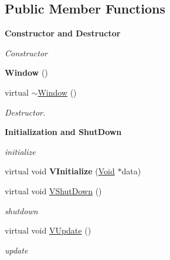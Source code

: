 \subsection*{Public Member Functions}
\begin{Indent}{\bf Constructor and Destructor}\par
{\em \label{_amgrp65b93122a8e010d8931d904429460f59}
 Constructor }\begin{DoxyCompactItemize}
\item 
\hypertarget{classPlatform_1_1Window_1_1Window_a6be8326ace2b30428402d1d25202b7e9}{
{\bfseries Window} ()}
\label{classPlatform_1_1Window_1_1Window_a6be8326ace2b30428402d1d25202b7e9}

\item 
\hypertarget{classPlatform_1_1Window_1_1Window_a2ec636db3227142e323d33bacab16a8b}{
virtual \hyperlink{classPlatform_1_1Window_1_1Window_a2ec636db3227142e323d33bacab16a8b}{$\sim$Window} ()}
\label{classPlatform_1_1Window_1_1Window_a2ec636db3227142e323d33bacab16a8b}

\begin{DoxyCompactList}\small\item\em Destructor. \item\end{DoxyCompactList}\end{DoxyCompactItemize}
\end{Indent}
\begin{Indent}{\bf Initialization and ShutDown}\par
{\em \label{_amgrp2a8ba145c14f2dcb11ba0fe271240078}
 initialize }\begin{DoxyCompactItemize}
\item 
\hypertarget{classPlatform_1_1Window_1_1Window_a6fb43803be5511e912e05552a6f57354}{
virtual void {\bfseries VInitialize} (\hyperlink{structVoid}{Void} $\ast$data)}
\label{classPlatform_1_1Window_1_1Window_a6fb43803be5511e912e05552a6f57354}

\item 
\hypertarget{classPlatform_1_1Window_1_1Window_ad02b2536b5c8203a6c38b6b2cd72a225}{
virtual void \hyperlink{classPlatform_1_1Window_1_1Window_ad02b2536b5c8203a6c38b6b2cd72a225}{VShutDown} ()}
\label{classPlatform_1_1Window_1_1Window_ad02b2536b5c8203a6c38b6b2cd72a225}

\begin{DoxyCompactList}\small\item\em shutdown \item\end{DoxyCompactList}\item 
\hypertarget{classPlatform_1_1Window_1_1Window_a479fa6dd0daa055fb2f34b6f2b27c04a}{
virtual void \hyperlink{classPlatform_1_1Window_1_1Window_a479fa6dd0daa055fb2f34b6f2b27c04a}{VUpdate} ()}
\label{classPlatform_1_1Window_1_1Window_a479fa6dd0daa055fb2f34b6f2b27c04a}

\begin{DoxyCompactList}\small\item\em update \item\end{DoxyCompactList}\end{DoxyCompactItemize}
\end{Indent}
